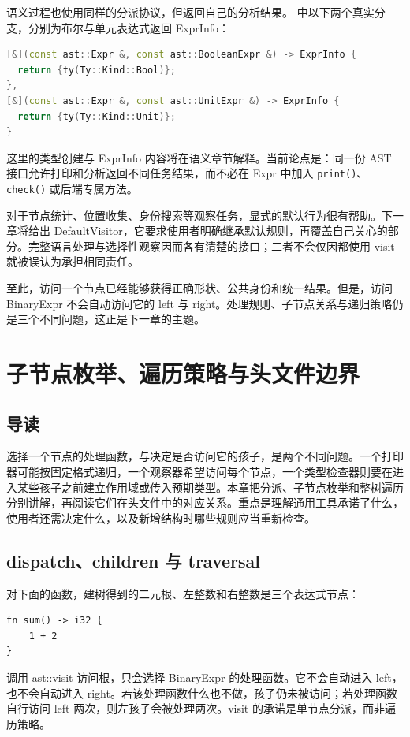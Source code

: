 语义过程也使用同样的分派协议，但返回自己的分析结果。 中以下两个真实分支，分别为布尔与单元表达式返回 ExprInfo：
\begin{lstlisting}[language=C++]
[&](const ast::Expr &, const ast::BooleanExpr &) -> ExprInfo {
  return {ty(Ty::Kind::Bool)};
},
[&](const ast::Expr &, const ast::UnitExpr &) -> ExprInfo {
  return {ty(Ty::Kind::Unit)};
}
\end{lstlisting}
这里的类型创建与 ExprInfo 内容将在语义章节解释。当前论点是：同一份 AST 接口允许打印和分析返回不同任务结果，而不必在 Expr 中加入 \texttt{print()}、\texttt{check()} 或后端专属方法。

对于节点统计、位置收集、身份搜索等观察任务，显式的默认行为很有帮助。下一章将给出 DefaultVisitor，它要求使用者明确继承默认规则，再覆盖自己关心的部分。完整语言处理与选择性观察因而各有清楚的接口；二者不会仅因都使用 visit 就被误认为承担相同责任。

至此，访问一个节点已经能够获得正确形状、公共身份和统一结果。但是，访问 BinaryExpr 不会自动访问它的 left 与 right。处理规则、子节点关系与递归策略仍是三个不同问题，这正是下一章的主题。

\chapter{子节点枚举、遍历策略与头文件边界}
\label{chap:front-traversal}

\section*{导读}
选择一个节点的处理函数，与决定是否访问它的孩子，是两个不同问题。一个打印器可能按固定格式递归，一个观察器希望访问每个节点，一个类型检查器则要在进入某些孩子之前建立作用域或传入预期类型。本章把分派、子节点枚举和整树遍历分别讲解，再阅读它们在头文件中的对应关系。重点是理解通用工具承诺了什么，使用者还需决定什么，以及新增结构时哪些规则应当重新检查。

\section{dispatch、children 与 traversal}
对下面的函数，建树得到的二元根、左整数和右整数是三个表达式节点：
\begin{lstlisting}[language=Rustless]
fn sum() -> i32 {
    1 + 2
}
\end{lstlisting}
调用 ast::visit 访问根，只会选择 BinaryExpr 的处理函数。它不会自动进入 left，也不会自动进入 right。若该处理函数什么也不做，孩子仍未被访问；若处理函数自行访问 left 两次，则左孩子会被处理两次。visit 的承诺是单节点分派，而非遍历策略。

